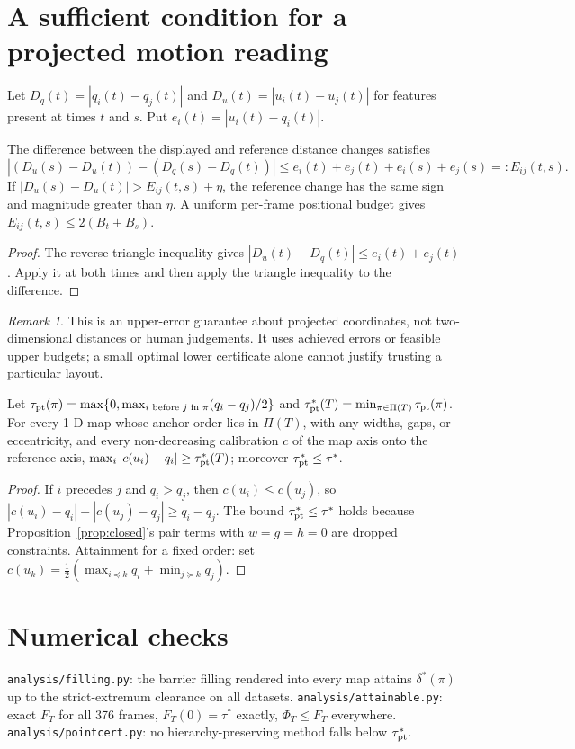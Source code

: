 \documentclass[11pt]{article}
\theoremstyle{remark}\newtheorem{remark}{Remark}
\begin{document}
\section{A sufficient condition for a projected motion reading}
Let $D_q(t)=|q_i(t)-q_j(t)|$ and $D_u(t)=|u_i(t)-u_j(t)|$ for features present at times $t$ and $s$. Put $e_i(t)=|u_i(t)-q_i(t)|$.
\begin{proposition}
The difference between the displayed and reference distance changes satisfies
\[ |(D_u(s)-D_u(t))-(D_q(s)-D_q(t))|\le e_i(t)+e_j(t)+e_i(s)+e_j(s)=:E_{ij}(t,s). \]
If $|D_u(s)-D_u(t)|>E_{ij}(t,s)+\eta$, the reference change has the same sign and magnitude greater than $\eta$. A uniform per-frame positional budget gives $E_{ij}(t,s)\le2(B_t+B_s)$.
\end{proposition}
\begin{proof}The reverse triangle inequality gives $|D_u(t)-D_q(t)|\le e_i(t)+e_j(t)$. Apply it at both times and then apply the triangle inequality to the difference.\end{proof}
\begin{remark}This is an upper-error guarantee about projected coordinates, not two-dimensional distances or human judgements. It uses achieved errors or feasible upper budgets; a small optimal lower certificate alone cannot justify trusting a particular layout.\end{remark}

\begin{proposition}\label{prop:ptcert}
Let $\tau_{\rm pt}(\pi)=\max\{0,\max_{i\text{ before }j\text{ in }\pi}(q_i-q_j)/2\}$ and $\tau^*_{\rm pt}(T)=\min_{\pi\in\Pi(T)}\tau_{\rm pt}(\pi)$. For every 1-D map whose anchor order lies in $\Pi(T)$, with any widths, gaps, or eccentricity, and every non-decreasing calibration $c$ of the map axis onto the reference axis, $\max_i|c(u_i)-q_i|\ge\tau^*_{\rm pt}(T)$; moreover $\tau^*_{\rm pt}\le\tau^*$.
\end{proposition}
\begin{proof}If $i$ precedes $j$ and $q_i>q_j$, then $c(u_i)\le c(u_j)$, so $|c(u_i)-q_i|+|c(u_j)-q_j|\ge q_i-q_j$. The bound $\tau^*_{\rm pt}\le\tau^*$ holds because Proposition~\ref{prop:closed}'s pair terms with $w=g=h=0$ are dropped constraints. Attainment for a fixed order: set $c(u_k)=\frac12(\max_{i\preceq k}q_i+\min_{j\succeq k}q_j)$.\end{proof}

\section{Numerical checks}\label{sec:numerics}
\texttt{analysis/filling.py}: the barrier filling rendered into every map attains $\delta^*(\pi)$ up to the strict-extremum clearance on all datasets. \texttt{analysis/attainable.py}: exact $F_T$ for all 376 frames, $F_T(0)=\tau^*$ exactly, $\Phi_T\le F_T$ everywhere. \texttt{analysis/pointcert.py}: no hierarchy-preserving method falls below $\tau^*_{\rm pt}$.
\end{document}
